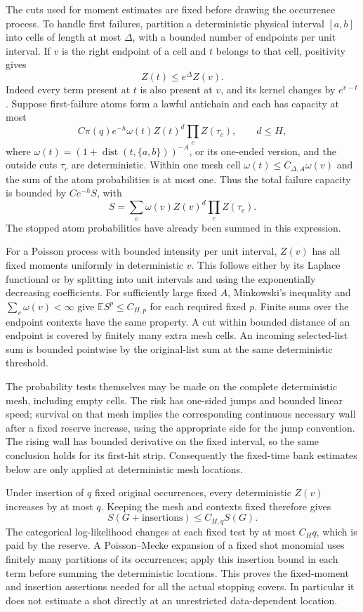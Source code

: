 The cuts used for moment estimates are fixed before drawing the
occurrence process. To handle first failures, partition a deterministic
physical interval $[a,b]$ into cells of length at most $\Delta$, with a
bounded number of endpoints per unit interval. If $v$ is the right
endpoint of a cell and $t$ belongs to that cell, positivity gives
\begin{equation}
 Z(t)\leq e^\Delta Z(v).
 \label{updetail:mesh-shot}
\end{equation}
Indeed every term present at $t$ is also present at $v$, and its kernel
changes by $e^{v-t}$. Suppose first-failure atoms form a lawful antichain
and each has capacity at most
\[
 C\pi(q)e^{-h}\omega(t)Z(t)^d\prod_c Z(\tau_c),
 \qquad d\leq H,
\]
where $\omega(t)=(1+\operatorname{dist}(t,\{a,b\}))^{-A}$, or its
one-ended version, and the outside cuts $\tau_c$ are deterministic.
Within one mesh cell $\omega(t)\leq C_{\Delta,A}\omega(v)$ and the
sum of the atom probabilities is at most one. Thus the total failure
capacity is bounded by $Ce^{-h}S$, with
\[
 S=\sum_v\omega(v)Z(v)^d\prod_c Z(\tau_c).
\]
The stopped atom probabilities have already been summed in this
expression.

For a Poisson process with bounded intensity per unit interval,
$Z(v)$ has all fixed moments uniformly in deterministic $v$. This
follows either by its Laplace functional or by splitting into unit
intervals and using the exponentially decreasing coefficients.
For sufficiently large fixed $A$, Minkowski's inequality and
$\sum_v\omega(v)<\infty$ give $\mathbb E S^p\leq C_{H,p}$ for
each required fixed $p$. Finite sums over the endpoint contexts have
the same property. A cut within bounded distance of an endpoint is
covered by finitely many extra mesh cells. An incoming selected-list
sum is bounded pointwise by the original-list sum at the same
deterministic threshold.

The probability tests themselves may be made on the complete
deterministic mesh, including empty cells. The risk has one-sided
jumps and bounded linear speed; survival on that mesh implies the
corresponding continuous necessary wall after a fixed reserve
increase, using the appropriate side for the jump convention. The
rising wall has bounded derivative on the fixed interval, so the
same conclusion holds for its first-hit strip. Consequently the
fixed-time bank estimates below are only applied at deterministic
mesh locations.

Under insertion of $q$ fixed original occurrences, every deterministic
$Z(v)$ increases by at most $q$. Keeping the mesh and contexts fixed
therefore gives
\begin{equation}
 S(G+\text{insertions})\leq C_{H,q}S(G).
 \label{updetail:shot-insertions}
\end{equation}
The categorical log-likelihood changes at each fixed test by at most
$C_Hq$, which is paid by the reserve. A Poisson--Mecke expansion of a
fixed shot monomial uses finitely many partitions of its occurrences;
apply this insertion bound in each term before summing the deterministic
locations. This proves the fixed-moment and insertion assertions needed
for all the actual stopping covers. In particular it does not estimate
a shot directly at an unrestricted data-dependent location.

